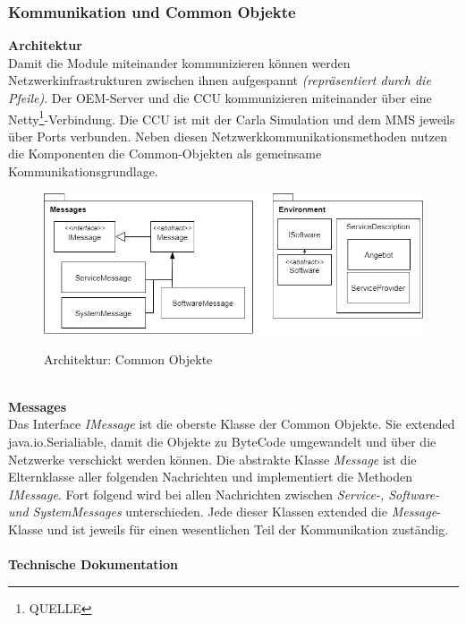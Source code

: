 \subsubsection{Kommunikation und Common Objekte}
\textbf{Architektur}\\
Damit die Module miteinander kommunizieren können werden Netzwerkinfrastrukturen zwischen ihnen aufgespannt \textit{(repräsentiert durch die Pfeile)}. Der OEM-Server und die CCU kommunizieren miteinander über eine Netty\footnote{QUELLE}-Verbindung. Die CCU ist mit der Carla Simulation und dem MMS jeweils über Ports verbunden. Neben diesen Netzwerkkommunikationsmethoden nutzen die Komponenten die Common-Objekten als gemeinsame Kommunikationsgrundlage. \\
\begin{figure}[!h]
	\centering
	\includegraphics[width=\columnwidth]{pictures/common.png}
	\label{img:common}
	\caption{Architektur: Common Objekte}
\end{figure}\\
\textbf{Messages}\\
Das Interface \textit{IMessage} ist die oberste Klasse der Common Objekte. Sie extended java.io.Serialiable, damit die Objekte zu ByteCode umgewandelt und über die Netzwerke verschickt werden können. Die abstrakte Klasse \textit{Message }ist die Elternklasse aller folgenden Nachrichten und implementiert die Methoden \textit{IMessage}. Fort folgend wird bei allen Nachrichten zwischen \textit{Service-, Software- und SystemMessages }unterschieden. Jede dieser Klassen extended die \textit{Message}-Klasse und ist jeweils für einen wesentlichen Teil der Kommunikation zuständig.\\
\\
\textbf{Technische Dokumentation}\\
